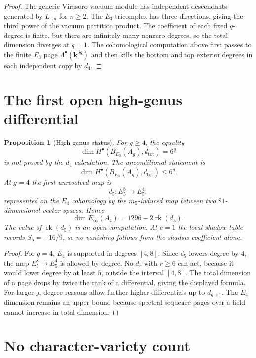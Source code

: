 \documentclass[11pt]{amsart}
\newtheorem{proposition}[theorem]{Proposition}
\theoremstyle{definition}
\providecommand{\kk}{\mathbf{k}}
\providecommand{\Lam}{\Lambda}
\providecommand{\rk}{\operatorname{rk}}
\begin{document}
\begin{proof}
The generic Virasoro vacuum module has independent descendants
generated by \(L_{-n}\) for \(n\geq2\). The \(E_3\) tricomplex has
three directions, giving the third power of the vacuum partition
product. The coefficient of each fixed \(q\)-degree is finite, but
there are infinitely many nonzero degrees, so the total dimension
diverges at \(q=1\). The cohomological computation above first passes
to the finite \(E_3\) page \(\Lam^\bullet(\kk^{3g})\) and then kills
the bottom and top exterior degrees in each independent copy by
\(d_4\).
\end{proof}

\section{The first open high-genus differential}

\begin{proposition}[High-genus status]
\label{prop:high-genus-status}
For \(g\geq4\), the equality
\[
  \dim H^\bullet(B_{E_3}(A_g),d_{\mathrm{tot}})=6^g
\]
is not proved by the \(d_4\) calculation. The unconditional statement is
\[
  \dim H^\bullet(B_{E_3}(A_g),d_{\mathrm{tot}})\leq6^g.
\]
At \(g=4\) the first unresolved map is
\[
  d_5:E_5^8\longrightarrow E_5^4,
\]
represented on the \(E_4\) cohomology by the \(m_5\)-induced map
between two \(81\)-dimensional vector spaces. Hence
\[
  \dim E_\infty(A_4)=1296-2\rk(d_5).
\]
The value of \(\rk(d_5)\) is an open computation. At \(c=1\) the local
shadow table records \(S_5=-16/9\), so no vanishing follows from the
shadow coefficient alone.
\end{proposition}

\begin{proof}
For \(g=4\), \(E_4\) is supported in degrees \([4,8]\). Since \(d_5\)
lowers degree by \(4\), the map \(E_5^8\to E_5^4\) is allowed by
degree. No \(d_r\) with \(r\geq6\) can act, because it would lower
degree by at least \(5\), outside the interval \([4,8]\). The total
dimension of a page drops by twice the rank of a differential, giving
the displayed formula. For larger \(g\), degree reasons allow further
higher differentials up to \(d_{g+1}\). The \(E_4\) dimension remains
an upper bound because spectral sequence pages over a field cannot
increase in total dimension.
\end{proof}

\section{No character-variety count}
\end{document}
